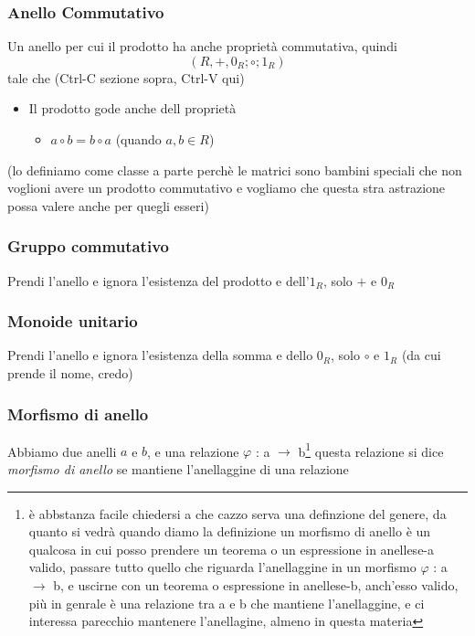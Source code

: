 \documentclass[11pt]{article}
\begin{document}
\subsubsection{Anello Commutativo}
\label{sec:orgcc8b834}
Un anello per cui il prodotto ha anche proprietà commutativa, quindi
\[ (R,+,0_R;\circ ; 1_R) \]
tale che (Ctrl-C sezione sopra, Ctrl-V qui)
\begin{itemize}
\item Il prodotto gode anche dell proprietà
\begin{itemize}
\item \(a \circ b = b \circ a\) (quando \(a,b \in R\))
\end{itemize}
\end{itemize}
(lo definiamo come classe a parte perchè le matrici sono bambini
speciali che non voglioni avere un prodotto commutativo e vogliamo che
questa stra astrazione possa valere anche per quegli esseri)

\subsubsection{Gruppo commutativo}
\label{sec:orgdaf1845}
Prendi l'anello e ignora l'esistenza del prodotto e dell'\(1_R\), solo \(+\) e \(0_R\)

\subsubsection{Monoide unitario}
\label{sec:orge2c727d}
Prendi l'anello e ignora l'esistenza della somma e dello \(0_R\), solo
\(\circ\) e \(1_R\) (da cui prende il nome, credo)

\subsubsection{Morfismo di anello}
\label{sec:org04d2243}
Abbiamo due anelli \(a\) e \(b\), e una relazione \(\varphi\) : a \(\to\) b\footnote{è
abbstanza facile chiedersi a che cazzo serva una definzione del
genere, da quanto si vedrà quando diamo la definizione un morfismo di
anello è un qualcosa in cui posso prendere un teorema o un espressione
in anellese-a valido, passare tutto quello che riguarda l'anellaggine
in un morfismo \(\varphi\) : a \(\to\) b, e uscirne con un teorema o espressione in
anellese-b, anch'esso valido, più in genrale è una relazione tra a e b
che mantiene l'anellaggine, e ci interessa parecchio mantenere
l'anellagine, almeno in questa materia}
questa relazione si dice \emph{morfismo di anello} se mantiene
l'anellaggine di una relazione
\end{document}
